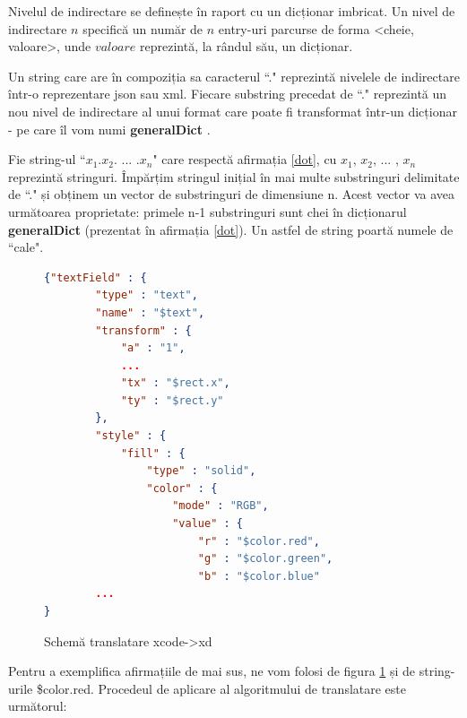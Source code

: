 \begin{mydef}\label{nivel}
Nivelul de indirectare se definește în raport cu un dicționar imbricat. Un nivel de indirectare $n$ specifică un număr de $n$ entry-uri parcurse de forma <cheie, valoare>, unde $valoare$ reprezintă, la rândul său, un dicționar.\\
\end{mydef}


\begin{mydef}\label{dot}
Un string care are în compoziția sa caracterul ``." reprezintă nivelele de indirectare într-o reprezentare json sau xml. Fiecare substring precedat de ``." reprezintă un nou nivel de indirectare al unui format care poate fi transformat într-un dicționar - pe care îl vom numi \textbf{generalDict} .\\
\end{mydef}


\begin{mydef}\label{count}
Fie string-ul ``$x_1$.$x_2$. ... .$x_n$" care respectă afirmația \ref{dot}, cu $x_1$, $x_2$, ... , $x_n$ reprezintă stringuri. Împărțim stringul inițial în mai multe substringuri delimitate de ``." și obținem un vector de substringuri de dimensiune n. Acest vector va avea următoarea proprietate: primele n-1 substringuri sunt chei în dicționarul \textbf{generalDict} (prezentat în afirmația \ref{dot}). Un astfel de string poartă numele de ``cale". \\
\end{mydef}


\begin{figure}[!htbp]
\begin{lstlisting}[language=json,firstnumber=1]
{"textField" : {
        "type" : "text",
        "name" : "$text",
        "transform" : {
            "a" : "1",
            ...
            "tx" : "$rect.x",
            "ty" : "$rect.y"
        },
        "style" : {
            "fill" : {
                "type" : "solid",
                "color" : {
                    "mode" : "RGB",
                    "value" : {
                        "r" : "$color.red",
                        "g" : "$color.green",
                        "b" : "$color.blue"
        ...
}

\end{lstlisting}
\caption{Schemă translatare xcode->xd} \label{fig:XCode2XD Schema}
\end{figure}

Pentru a exemplifica afirmațiile de mai sus, ne vom folosi de figura \ref{fig:XCode2XD Schema} și de string-urile \$color.red. Procedeul de aplicare al algoritmului de translatare este următorul:

